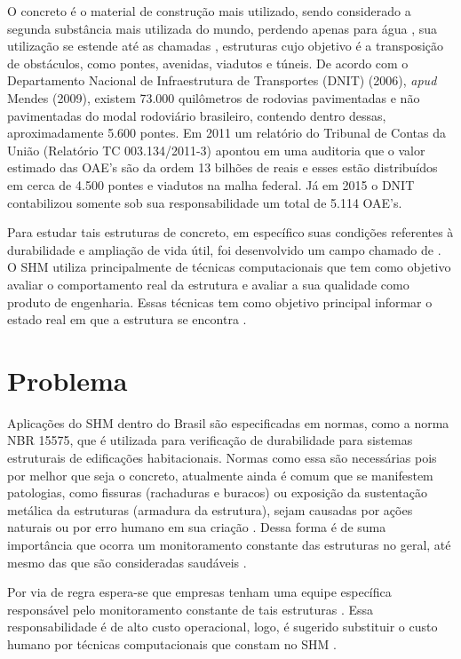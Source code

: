 O concreto é o material de construção mais utilizado, sendo considerado a segunda substância mais utilizada do mundo, perdendo apenas para água \cite{Gagg2014}, sua utilização se estende até as chamadas , estruturas cujo objetivo é a transposição de obstáculos, como pontes, avenidas, viadutos e túneis. 
De acordo com o Departamento Nacional de Infraestrutura de Transportes (DNIT) (2006), \textit{apud} Mendes (2009), existem 73.000 quilômetros de rodovias pavimentadas e não pavimentadas do modal rodoviário brasileiro, contendo dentro dessas, aproximadamente 5.600 pontes. 
Em 2011 um relatório do Tribunal de Contas da União (Relatório TC 003.134/2011-3) apontou em uma auditoria que o valor estimado das OAE's são da ordem 13 bilhões de reais e esses estão distribuídos em cerca de 4.500 pontes e viadutos na malha federal. Já em 2015 o DNIT contabilizou somente sob sua responsabilidade um total de 5.114 OAE’s.

Para estudar tais estruturas de concreto, em específico suas condições referentes à durabilidade e ampliação de vida útil, foi desenvolvido um campo chamado de  \cite{de2011durabiliidade}.
O SHM utiliza principalmente de técnicas computacionais que tem como objetivo avaliar o comportamento real da estrutura e avaliar a sua qualidade como produto de engenharia. 
Essas técnicas tem como objetivo principal informar o estado real em que a estrutura se encontra \cite{inaudi2009structural}.


\section{Problema}

Aplicações do SHM dentro do Brasil são especificadas em normas, como a norma NBR 15575, que é utilizada para verificação de durabilidade para sistemas estruturais de edificações habitacionais.
Normas como essa são necessárias pois por melhor que seja o concreto, atualmente ainda é comum que se manifestem patologias, como fissuras (rachaduras e buracos) ou exposição da sustentação metálica da estruturas (armadura da estrutura), sejam causadas por ações naturais ou por erro humano em sua criação \cite{afonso2021}. 
Dessa forma é de suma importância que ocorra um monitoramento constante das estruturas no geral, até mesmo das que são consideradas saudáveis \cite{statera}.

Por via de regra espera-se que empresas tenham uma equipe específica responsável pelo monitoramento constante de tais estruturas \cite{statera}.
Essa responsabilidade é de alto custo operacional, logo, é sugerido substituir o custo humano por técnicas computacionais que constam no SHM \cite{Liu2002}.

